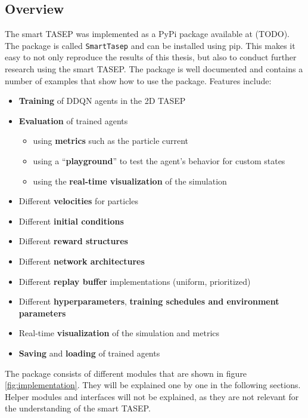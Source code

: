 \subsection{Overview}
\label{subsec:implementation-overview}
The smart TASEP was implemented as a PyPi package available at (TODO). The package is called \texttt{SmartTasep} and can be installed using pip. This makes it easy to not only reproduce the results of this thesis, but also to conduct further research using the smart TASEP. The package is well documented and contains a number of examples that show how to use the package. Features include:
\begin{itemize}
    \item \textbf{Training} of DDQN agents in the 2D TASEP
    \item \textbf{Evaluation} of trained agents
    \begin{itemize}
        \item using \textbf{metrics} such as the particle current
        \item using a \enquote{\textbf{playground}} to test the agent's behavior for custom states
        \item using the \textbf{real-time visualization} of the simulation
    \end{itemize} 
    \item Different \textbf{velocities} for particles
    \item Different \textbf{initial conditions}
    \item Different \textbf{reward structures}
    \item Different \textbf{network architectures}
    \item Different \textbf{replay buffer} implementations (uniform, prioritized)
    \item Different \textbf{hyperparameters}, \textbf{training schedules and environment parameters}
    \item Real-time \textbf{visualization} of the simulation and metrics
    \item \textbf{Saving} and \textbf{loading} of trained agents
\end{itemize}
The package consists of different modules that are shown in figure \ref{fig:implementation}. They will be explained one by one in the following sections. Helper modules and interfaces will not be explained, as they are not relevant for the understanding of the smart TASEP. 

